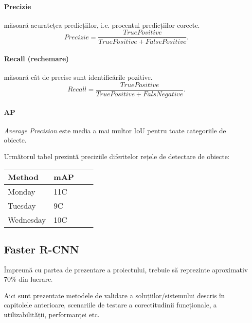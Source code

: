 \paragraph{Precizie} măsoară acuratețea predicțiilor, i.e. procentul predicțiilor corecte.
\begin{equation}
Precizie = \frac{TruePositive}{TruePositive + FalsePositive}.
\end{equation}

\paragraph{Recall (rechemare)} măsoară cât de precise sunt identificările pozitive.
\begin{equation}
Recall = \frac{TruePositive}{TruePositive + FalsNegative}.
\end{equation}

\paragraph{AP} \textit{Average Precision} este media a mai multor IoU pentru toate categoriile de obiecte.

Următorul tabel prezintă preciziile diferitelor rețele de detectare de obiecte:

\begin{center}
    \begin{tabular}{| l | l | l | l |}
    \hline
    Method & mAP \\ \hline
    Monday & 11C \\ \hline
    Tuesday & 9C  \\ \hline
    Wednesday & 10C \\  \hline
    \end{tabular}
\end{center}



\subsection{Faster R-CNN}






Împreună cu partea de prezentare a proiectului, trebuie să reprezinte aproximativ 70\% din lucrare. 

Aici sunt prezentate metodele de validare a soluțiilor/sistemului descris în capitolele anterioare, scenariile de testare a corectitudinii funcționale, a utilizabilității, performanței etc.   

